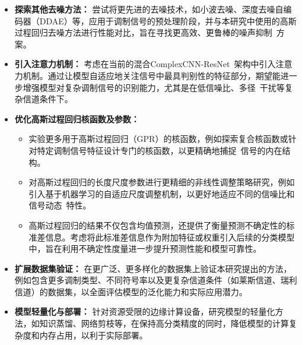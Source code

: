 \documentclass[conference]{IEEEtran}
\begin{document}
\begin{itemize}
    \item \textbf{探索其他去噪方法：} 尝试将更先进的去噪技术，如小波去噪、深度去噪自编码器（DDAE）等，应用于调制信号的预处理阶段，并与本研究中使用的高斯过程回归去噪方法进行性能对比，旨在寻找更高效、更鲁棒的噪声抑制~方案。
    \item \textbf{引入注意力机制：} 考虑在当前的混合ComplexCNN-ResNet~架构中引入注意力机制。通过让模型自适应地关注信号中最具判别性的特征部分，期望能进一步增强模型对复杂调制信号的识别能力，尤其是在低信噪比、多径~干扰等复杂信道条件下。
    \item \textbf{优化高斯过程回归核函数及参数：}
    \begin{itemize}
        \item 实验更多用于高斯过程回归（GPR）的核函数，例如探索复合核函数或针对特定调制信号特征设计专门的核函数，以更精确地捕捉~信号的内在结构。
        \item 对高斯过程回归的长度尺度参数进行更精细的非线性调整策略研究，例如引入基于机器学习的自适应尺度调整机制，以更好地适应不同的信噪比和信号动态~特性。
        \item 高斯过程回归的结果不仅包含均值预测，还提供了衡量预测不确定性的标准差信息。考虑将此标准差信息作为附加特征或权重引入后续的分类模型中，旨在利用不确定性度量进一步提升预测性能和模型可靠性。
    \end{itemize}
    \item \textbf{扩展数据集验证：} 在更广泛、更多样化的数据集上验证本研究提出的方法，例如包含更多调制类型、不同符号率以及更复杂信道条件（如莱斯信道、瑞利信道）的数据集，以全面评估模型的泛化能力和实际应用潜力。
    \item \textbf{模型轻量化与部署：} 针对资源受限的边缘计算设备，研究模型的轻量化方法，如知识蒸馏、网络剪枝等，在保持高分类精度的同时，降低模型的计算复杂度和内存占用，以利于实际部署。
\end{itemize}

\printbibliography
\end{document}
